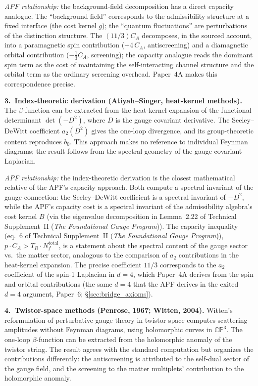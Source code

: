 \documentclass[11pt]{article}
\theoremstyle{definition}
\newcommand{\TSII}{Technical Supplement~II (\emph{The Foundational Gauge Program})}
\begin{document}
\textit{APF relationship:} the background-field decomposition has a
direct capacity analogue.  The ``background field'' corresponds to
the admissibility structure at a fixed interface (the cost kernel $g$);
the ``quantum fluctuations'' are perturbations of the distinction
structure.  The $(11/3)C_A$ decomposes, in the sourced account, into
a paramagnetic spin contribution ($+4\,C_A$, antiscreening) and a
diamagnetic orbital contribution ($-\tfrac{1}{3}C_A$, screening); the
capacity analogue reads the dominant spin term as the cost of
maintaining the self-interacting channel structure and the orbital
term as the ordinary screening overhead.  Paper~4A makes this
correspondence precise.

\smallskip\noindent\textbf{3.\ Index-theoretic derivation
(Atiyah--Singer, heat-kernel methods).}\quad
The $\beta$-function can be extracted from the heat-kernel expansion
of the functional determinant $\det(-D^2)$, where $D$ is the gauge
covariant derivative.  The Seeley--DeWitt coefficient $a_2(D^2)$
gives the one-loop divergence, and its group-theoretic content
reproduces $b_0$.  This approach makes no reference to individual
Feynman diagrams; the result follows from the spectral geometry of
the gauge-covariant Laplacian.

\textit{APF relationship:} the index-theoretic derivation is the
closest mathematical relative of the APF's capacity approach.  Both
compute a spectral invariant of the gauge connection: the
Seeley--DeWitt coefficient is a spectral invariant of $-D^2$, while
the APF's capacity cost is a spectral invariant of the admissibility
algebra's cost kernel $B$ (via the eigenvalue decomposition in
Lemma~2.22 of \TSII{}).  The capacity inequality
(eq.~6 of \TSII{}), $p \cdot C_A > T_R \cdot N_f^{\mathrm{total}}$,
is a statement about the spectral content of the gauge sector
vs.\ the matter sector, analogous to the comparison of
$a_2$ contributions in the heat-kernel expansion.  The precise
coefficient $11/3$ corresponds to the $a_2$ coefficient of the
spin-1 Laplacian in $d = 4$, which Paper~4A derives from
the spin and orbital contributions (the same $d = 4$ that the APF derives in
the exited $d{=}4$ argument, Paper~6; \S\ref{sec:bridge_axioms}).

\smallskip\noindent\textbf{4.\ Twistor-space methods
(Penrose, 1967; Witten, 2004).}\quad
Witten's reformulation of perturbative gauge theory in twistor space
computes scattering amplitudes without Feynman diagrams, using
holomorphic curves in $\mathbb{CP}^3$.  The one-loop $\beta$-function
can be extracted from the holomorphic anomaly of the twistor string.
The result agrees with the standard computation but organizes the
contributions differently: the antiscreening is attributed to the
self-dual sector of the gauge field, and the screening to the
matter multiplets' contribution to the holomorphic anomaly.
\end{document}
